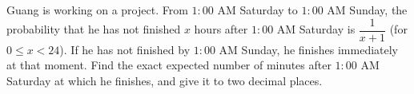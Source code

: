 Guang is working on a project. From $1{:}00$ AM Saturday to $1{:}00$ AM Sunday, the probability that he has not finished $x$ hours after $1{:}00$ AM Saturday is $\dfrac1{x+1}$ (for $0\le x<24$). If he has not finished by $1{:}00$ AM Sunday, he finishes immediately at that moment. Find the exact expected number of minutes after $1{:}00$ AM Saturday at which he finishes, and give it to two decimal places.
